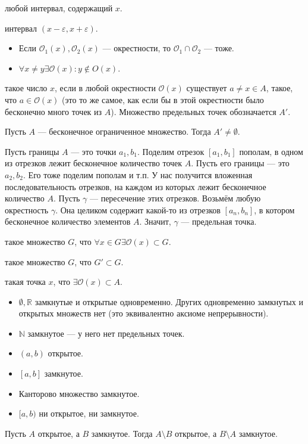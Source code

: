 \documentclass[12pt,a4paper]{article}
\begin{document}
 любой интервал, содержащий $x$.

 интервал $(x-\varepsilon,x+\varepsilon)$.


\begin{itemize}
	\item Если $\mathcal O_1(x),\mathcal O_2(x)$ --- окрестности, то $\mathcal O_1\cap \mathcal O_2$ --- тоже.
	\item $\forall x\neq y\exists \mathcal O(x):y\notin O(x)$.
\end{itemize}

 такое число $x$, если в любой окрестности $\mathcal O(x)$ существует $a\neq x\in A$, такое, что $a\in\mathcal O(x)$ (это то же самое, как если бы в этой окрестности было бесконечно много точек из $A$). Множество предельных точек обозначается $A'$.

\theorem Пусть $A$ --- бесконечное ограниченное множество. Тогда $A'\neq\emptyset$.

\proof Пусть границы $A$ --- это точки $a_1,b_1$. Поделим отрезок $[a_1,b_1]$ пополам, в одном из отрезков лежит бесконечное количество точек $A$. Пусть его границы --- это $a_2,b_2$. Его тоже поделим пополам и т.п. У нас получится вложенная последовательность отрезков, на каждом из которых лежит бесконечное количество $A$. Пусть $\gamma$ --- пересечение этих отрезков. Возьмём любую окрестность $\gamma$. Она целиком содержит какой-то из отрезков $[a_n,b_n]$, в котором бесконечное количество элементов $A$. Значит, $\gamma$ --- предельная точка.\QEDA

\newpage

 такое множество $G$, что $\forall x\in G\exists \mathcal O(x)\subset G$.

 такое множество $G$, что $G'\subset G$.

 такая точка $x$, что $\exists\mathcal O(x)\subset A$.


\begin{itemize}
	\item $\emptyset,\mathbb R$ замкнутые и открытые одновременно. Других одновременно замкнутых и открытых множеств нет (это эквивалентно аксиоме непрерывности).
	\item $\mathbb N$ замкнутое --- у него нет предельных точек.
	\item $(a,b)$ открытое.
	\item $[a,b]$ замкнутое.
	\item Канторово множество замкнутое.
	\item $[a,b)$ ни открытое, ни замкнутое.
\end{itemize}

\theorem Пусть $A$ открытое, а $B$ замкнутое. Тогда $A\setminus B$ открытое, а $B\setminus A$ замкнутое.
\end{document}
